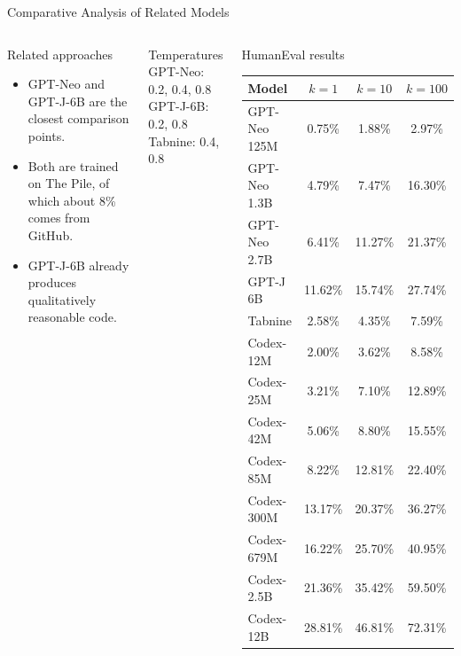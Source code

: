 \documentclass[aspectratio=43,9pt]{beamer}
\begin{document}
\begin{frame}{Comparative Analysis of Related Models}
\tiny
\begin{columns}[T,totalwidth=\textwidth]
\begin{block}{Related approaches}
\begin{itemize}
  \item GPT-Neo and GPT-J-6B are the closest comparison points.
  \item Both are trained on The Pile, of which about 8\% comes from GitHub.
  \item GPT-J-6B already produces qualitatively reasonable code.
\end{itemize}
\end{block}

\begin{block}{Temperatures}
GPT-Neo: 0.2, 0.4, 0.8\\
GPT-J-6B: 0.2, 0.8\\
Tabnine: 0.4, 0.8
\end{block}

\begin{block}{HumanEval results}
\begin{tabular}{lccc}
\toprule
Model & \(k=1\) & \(k=10\) & \(k=100\)\\
\midrule
GPT-Neo 125M & 0.75\% & 1.88\% & 2.97\%\\
GPT-Neo 1.3B & 4.79\% & 7.47\% & 16.30\%\\
GPT-Neo 2.7B & 6.41\% & 11.27\% & 21.37\%\\
GPT-J 6B & 11.62\% & 15.74\% & 27.74\%\\
Tabnine & 2.58\% & 4.35\% & 7.59\%\\
\midrule
Codex-12M & 2.00\% & 3.62\% & 8.58\%\\
Codex-25M & 3.21\% & 7.10\% & 12.89\%\\
Codex-42M & 5.06\% & 8.80\% & 15.55\%\\
Codex-85M & 8.22\% & 12.81\% & 22.40\%\\
Codex-300M & 13.17\% & 20.37\% & 36.27\%\\
Codex-679M & 16.22\% & 25.70\% & 40.95\%\\
Codex-2.5B & 21.36\% & 35.42\% & 59.50\%\\
Codex-12B & 28.81\% & 46.81\% & 72.31\%\\
\bottomrule
\end{tabular}
\end{block}


\end{columns}
\end{frame}
\end{document}
